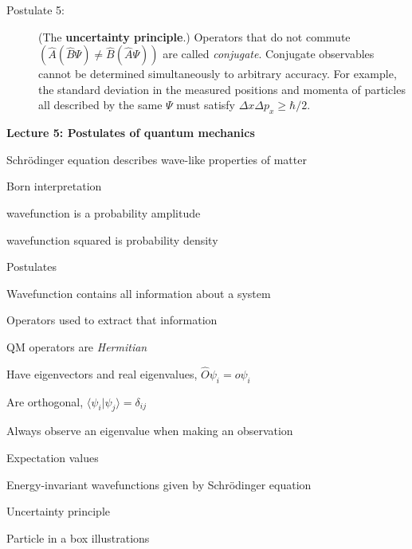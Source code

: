 \message{ !name(Outline.tex)}\documentclass[11pt]{article}
\begin{document}
\begin{outline}
\begin{table}
\begin{center}
\begin{description}
{}
    \item[Postulate 5:] (The {\bf uncertainty principle}.)  Operators that do not commute
      $(\hat{A}(\hat{B}\Psi)\neq\hat{B}(\hat{A}\Psi))$ are called {\em conjugate}.
      Conjugate observables cannot be determined simultaneously to arbitrary accuracy.
      For example, the standard deviation in the measured positions and momenta of
      particles all described by the same $\Psi$ must satisfy $\Delta x\Delta p_x \geq \hbar/2$.
    \end{description}
\end{center}
\end{table}

\item{{\bf Lecture 5: Postulates of quantum mechanics}}
  \begin{outline}
  \item{Schr\"{o}dinger equation describes wave-like properties of matter}
  \item{Born interpretation}
    \begin{outline}
      \item wavefunction is a probability amplitude
      \item wavefunction squared is probability density
    \end{outline}

  \item{Postulates}
    \begin{outline}
    \item{Wavefunction contains all information about a system}
    \item{Operators used to extract that information}
      \begin{outline}
      \item QM operators are {\em Hermitian}
      \item Have eigenvectors and real eigenvalues, $\hat{O}\psi_i=o\psi_i$
      \item Are orthogonal, $\langle \psi_i | \psi_j \rangle = \delta_{ij}$
      \item Always observe an eigenvalue when making an observation
      \end{outline}
    \item{Expectation values}
    \item{Energy-invariant wavefunctions given by Schr\"odinger equation}
    \item{Uncertainty principle}
    \end{outline}
  \item{Particle in a box illustrations}
  \end{outline}


\end{outline}
\end{document}

